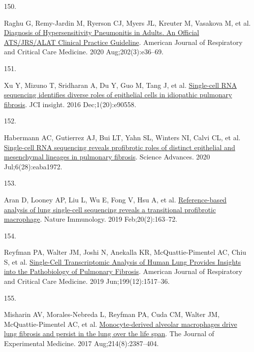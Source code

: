 \documentclass[
]{article}
\newlength{\cslhangindent}
\newlength{\csllabelwidth}
\newenvironment{CSLReferences}[2] %
 {\begin{list}{}{%
  \setlength{\itemindent}{0pt}
  \setlength{\leftmargin}{0pt}
  \setlength{\parsep}{0pt}
  \ifodd #1
   \setlength{\leftmargin}{\cslhangindent}
   \setlength{\itemindent}{-1\cslhangindent}
  \fi
  \setlength{\itemsep}{#2\baselineskip}}}
 {\end{list}}
\newcommand{\CSLLeftMargin}[1]{\parbox[t]{\csllabelwidth}{\strut#1\strut}}
\newcommand{\CSLRightInline}[1]{\parbox[t]{\linewidth - \csllabelwidth}{\strut#1\strut}}
\begin{document}
\begin{CSLReferences}{0}{1}
\CSLLeftMargin{150. }%
\CSLRightInline{Raghu G, Remy-Jardin M, Ryerson CJ, Myers JL, Kreuter M, Vasakova M, et al. \href{https://doi.org/10.1164/rccm.202005-2032ST}{Diagnosis of {Hypersensitivity} {Pneumonitis} in {Adults}. {An} {Official} {ATS}/{JRS}/{ALAT} {Clinical} {Practice} {Guideline}}. American Journal of Respiratory and Critical Care Medicine. 2020 Aug;202(3):e36--69. }

\CSLLeftMargin{151. }%
\CSLRightInline{Xu Y, Mizuno T, Sridharan A, Du Y, Guo M, Tang J, et al. \href{https://doi.org/10.1172/jci.insight.90558}{Single-cell {RNA} sequencing identifies diverse roles of epithelial cells in idiopathic pulmonary fibrosis}. JCI insight. 2016 Dec;1(20):e90558. }

\CSLLeftMargin{152. }%
\CSLRightInline{Habermann AC, Gutierrez AJ, Bui LT, Yahn SL, Winters NI, Calvi CL, et al. \href{https://doi.org/10.1126/sciadv.aba1972}{Single-cell {RNA} sequencing reveals profibrotic roles of distinct epithelial and mesenchymal lineages in pulmonary fibrosis}. Science Advances. 2020 Jul;6(28):eaba1972. }

\CSLLeftMargin{153. }%
\CSLRightInline{Aran D, Looney AP, Liu L, Wu E, Fong V, Hsu A, et al. \href{https://doi.org/10.1038/s41590-018-0276-y}{Reference-based analysis of lung single-cell sequencing reveals a transitional profibrotic macrophage}. Nature Immunology. 2019 Feb;20(2):163--72. }

\CSLLeftMargin{154. }%
\CSLRightInline{Reyfman PA, Walter JM, Joshi N, Anekalla KR, McQuattie-Pimentel AC, Chiu S, et al. \href{https://doi.org/10.1164/rccm.201712-2410OC}{Single-{Cell} {Transcriptomic} {Analysis} of {Human} {Lung} {Provides} {Insights} into the {Pathobiology} of {Pulmonary} {Fibrosis}}. American Journal of Respiratory and Critical Care Medicine. 2019 Jun;199(12):1517--36. }

\CSLLeftMargin{155. }%
\CSLRightInline{Misharin AV, Morales-Nebreda L, Reyfman PA, Cuda CM, Walter JM, McQuattie-Pimentel AC, et al. \href{https://doi.org/10.1084/jem.20162152}{Monocyte-derived alveolar macrophages drive lung fibrosis and persist in the lung over the life span}. The Journal of Experimental Medicine. 2017 Aug;214(8):2387--404. }


\end{CSLReferences}
\end{document}
